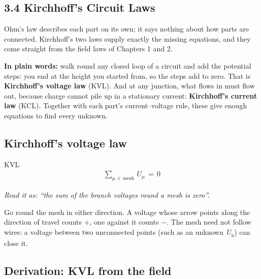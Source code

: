 \documentclass[11pt]{article}
\begin{document}
\begin{keepsection}
\section{3.4 Kirchhoff’s Circuit Laws}

Ohm’s law describes each part on its own; it says nothing about how parts are connected. Kirchhoff’s two laws supply exactly the missing equations, and they come straight from the field laws of Chapters 1 and 2.

\begin{plainbox}\textbf{In plain words:} walk round any closed loop of a circuit and add the potential steps: you end at the height you started from, so the steps add to zero. That is \textbf{Kirchhoff’s voltage law} (KVL). And at any junction, what flows in must flow out, because charge cannot pile up in a stationary current: \textbf{Kirchhoff’s current law} (KCL). Together with each part’s current–voltage rule, these give enough equations to find every unknown.\end{plainbox}

\begin{keepsection}
\subsection{Kirchhoff’s voltage law}

\begin{equationcard}{KVL}
\[ \begin{gathered} \sum_{μ\, \in \, \text{mesh}}^{} \, {U}_{μ}\, =\, 0 \end{gathered} \]
{\small \emph{Read it as: “the sum of the branch voltages round a mesh is zero”.}\par Go round the mesh in either direction. A voltage whose arrow points along the direction of travel counts +, one against it counts \ensuremath{-}. The mesh need not follow wires: a voltage between two unconnected points (such as an unknown \textit{U}\textsubscript{x}) can close it.}
\end{equationcard}
\end{keepsection}

\begin{keepsection}
\subsection{Derivation: KVL from the field}


\end{keepsection}
\end{keepsection}
\end{document}
